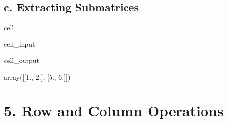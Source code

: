 \documentclass[letterpaper,10pt,english]{jupyterBook}
\begin{document}
\subsection{c. Extracting Submatrices}
\label{\detokenize{lessons/Intro_to_Matrices_in_NumPy:c-extracting-submatrices}}
\begin{sphinxuseclass}{cell}\begin{sphinxVerbatimInput}

\begin{sphinxuseclass}{cell_input}
\begin{sphinxVerbatim}[commandchars=\\\{\}]
  \PYG{p}{[} \PYG{p}{]}
\end{sphinxVerbatim}

\end{sphinxuseclass}\end{sphinxVerbatimInput}
\begin{sphinxVerbatimOutput}

\begin{sphinxuseclass}{cell_output}
\begin{sphinxVerbatim}[commandchars=\\\{\}]
array([[1., 2.],
       [5., 6.]])
\end{sphinxVerbatim}

\end{sphinxuseclass}\end{sphinxVerbatimOutput}

\end{sphinxuseclass}

\section{5. Row and Column Operations}
\label{\detokenize{lessons/Intro_to_Matrices_in_NumPy:row-and-column-operations}}
\end{document}
